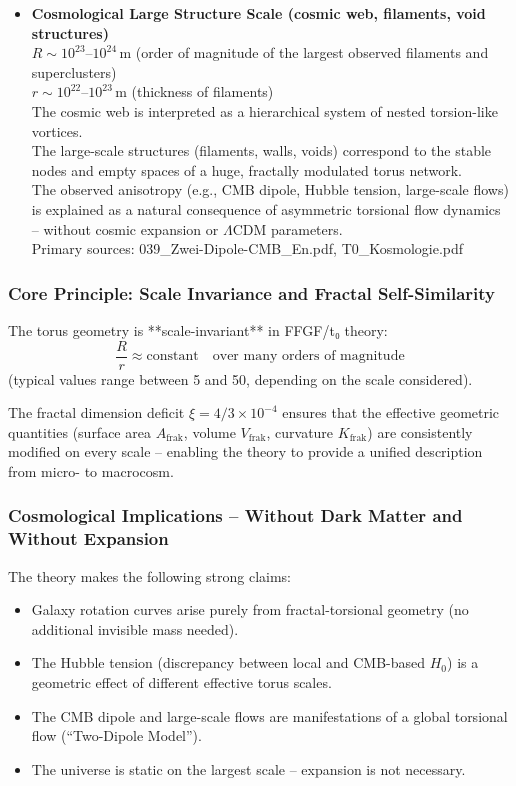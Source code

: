 \begin{itemize}
	\item \textbf{Cosmological Large Structure Scale (cosmic web, filaments, void structures)} \\
	$R \sim 10^{23}$–$10^{24}\,\text{m}$ (order of magnitude of the largest observed filaments and superclusters) \\
	$r \sim 10^{22}$–$10^{23}\,\text{m}$ (thickness of filaments) \\
	The cosmic web is interpreted as a hierarchical system of nested torsion-like vortices. \\
	The large-scale structures (filaments, walls, voids) correspond to the stable nodes and empty spaces of a huge, fractally modulated torus network. \\
	The observed anisotropy (e.g., CMB dipole, Hubble tension, large-scale flows) is explained as a natural consequence of asymmetric torsional flow dynamics – without cosmic expansion or $\Lambda$CDM parameters. \\
	Primary sources: 039\_Zwei-Dipole-CMB\_En.pdf, T0\_Kosmologie.pdf
\end{itemize}

\subsubsection{Core Principle: Scale Invariance and Fractal Self-Similarity}

The torus geometry is **scale-invariant** in FFGF/t₀ theory:
\[
\frac{R}{r} \approx \text{constant} \quad \text{over many orders of magnitude}
\]
(typical values range between 5 and 50, depending on the scale considered).

The fractal dimension deficit $\xi = 4/3 \times 10^{-4}$ ensures that the effective geometric quantities (surface area $A_{\text{frak}}$, volume $V_{\text{frak}}$, curvature $K_{\text{frak}}$) are consistently modified on every scale – enabling the theory to provide a unified description from micro- to macrocosm.

\subsubsection{Cosmological Implications – Without Dark Matter and Without Expansion}

The theory makes the following strong claims:
\begin{itemize}
	\item Galaxy rotation curves arise purely from fractal-torsional geometry (no additional invisible mass needed).
	\item The Hubble tension (discrepancy between local and CMB-based $H_0$) is a geometric effect of different effective torus scales.
	\item The CMB dipole and large-scale flows are manifestations of a global torsional flow (``Two-Dipole Model'').
	\item The universe is static on the largest scale – expansion is not necessary.
\end{itemize}

